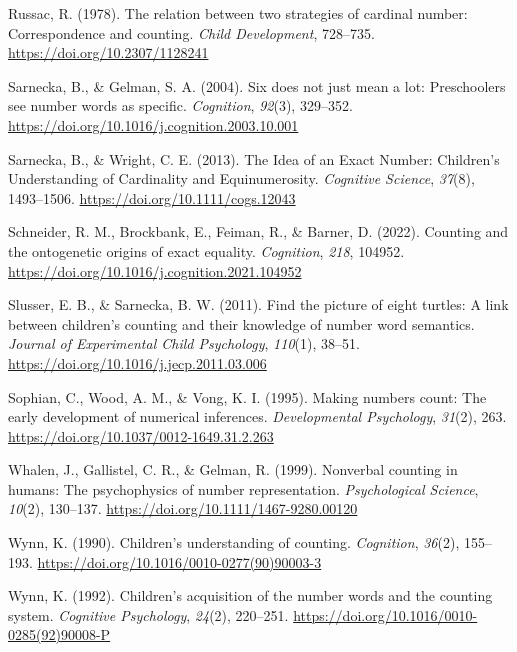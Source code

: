 \documentclass[10pt, letterpaper]{article}
\newenvironment{CSLReferences}%
  {}%
  {\par}
\begin{document}
\begin{CSLReferences}
\leavevmode{}%
Russac, R. (1978). The relation between two strategies of cardinal
number: Correspondence and counting. \emph{Child Development}, 728--735.
\url{https://doi.org/10.2307/1128241}

\leavevmode{}%
Sarnecka, B., \& Gelman, S. A. (2004). Six does not just mean a lot:
Preschoolers see number words as specific. \emph{Cognition},
\emph{92}(3), 329--352.
\url{https://doi.org/10.1016/j.cognition.2003.10.001}

\leavevmode{}%
Sarnecka, B., \& Wright, C. E. (2013). The {Idea} of an {Exact}
{Number}: {Children}'s {Understanding} of {Cardinality} and
{Equinumerosity}. \emph{Cognitive Science}, \emph{37}(8), 1493--1506.
\url{https://doi.org/10.1111/cogs.12043}

\leavevmode{}%
Schneider, R. M., Brockbank, E., Feiman, R., \& Barner, D. (2022).
Counting and the ontogenetic origins of exact equality.
\emph{Cognition}, \emph{218}, 104952.
\url{https://doi.org/10.1016/j.cognition.2021.104952}

\leavevmode{}%
Slusser, E. B., \& Sarnecka, B. W. (2011). Find the picture of eight
turtles: A link between children's counting and their knowledge of
number word semantics. \emph{Journal of Experimental Child Psychology},
\emph{110}(1), 38--51. \url{https://doi.org/10.1016/j.jecp.2011.03.006}

\leavevmode{}%
Sophian, C., Wood, A. M., \& Vong, K. I. (1995). Making numbers count:
The early development of numerical inferences. \emph{Developmental
Psychology}, \emph{31}(2), 263.
\url{https://doi.org/10.1037/0012-1649.31.2.263}

\leavevmode{}%
Whalen, J., Gallistel, C. R., \& Gelman, R. (1999). Nonverbal counting
in humans: The psychophysics of number representation.
\emph{Psychological Science}, \emph{10}(2), 130--137.
\url{https://doi.org/10.1111/1467-9280.00120}

\leavevmode{}%
Wynn, K. (1990). Children's understanding of counting. \emph{Cognition},
\emph{36}(2), 155--193.
\url{https://doi.org/10.1016/0010-0277(90)90003-3}

\leavevmode{}%
Wynn, K. (1992). Children's acquisition of the number words and the
counting system. \emph{Cognitive Psychology}, \emph{24}(2), 220--251.
\url{https://doi.org/10.1016/0010-0285(92)90008-P}

\end{CSLReferences}


\end{document}
